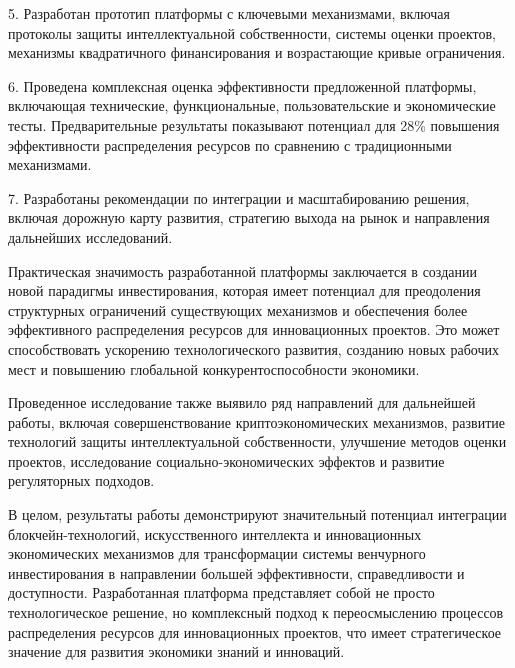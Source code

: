 \documentclass[
    14pt,
    specialist,
    candidate, %
    subf, %
    href,
    times,
    dotsinheaders=false,
    colorlinks=false
]{disser}
\begin{document}
5. Разработан прототип платформы с ключевыми механизмами, включая протоколы защиты интеллектуальной собственности, системы оценки проектов, механизмы квадратичного финансирования и возрастающие кривые ограничения.

6. Проведена комплексная оценка эффективности предложенной платформы, включающая технические, функциональные, пользовательские и экономические тесты. Предварительные результаты показывают потенциал для 28\% повышения эффективности распределения ресурсов по сравнению с традиционными механизмами.

7. Разработаны рекомендации по интеграции и масштабированию решения, включая дорожную карту развития, стратегию выхода на рынок и направления дальнейших исследований.

Практическая значимость разработанной платформы заключается в создании новой парадигмы инвестирования, которая имеет потенциал для преодоления структурных ограничений существующих механизмов и обеспечения более эффективного распределения ресурсов для инновационных проектов. Это может способствовать ускорению технологического развития, созданию новых рабочих мест и повышению глобальной конкурентоспособности экономики.

Проведенное исследование также выявило ряд направлений для дальнейшей работы, включая совершенствование криптоэкономических механизмов, развитие технологий защиты интеллектуальной собственности, улучшение методов оценки проектов, исследование социально-экономических эффектов и развитие регуляторных подходов.

В целом, результаты работы демонстрируют значительный потенциал интеграции блокчейн-технологий, искусственного интеллекта и инновационных экономических механизмов для трансформации системы венчурного инвестирования в направлении большей эффективности, справедливости и доступности. Разработанная платформа представляет собой не просто технологическое решение, но комплексный подход к переосмыслению процессов распределения ресурсов для инновационных проектов, что имеет стратегическое значение для развития экономики знаний и инноваций.

\renewcommand{\bibname}{\fontsize{14pt}{21pt}\selectfont СПИСОК ИСПОЛЬЗОВАННЫХ ИСТОЧНИКОВ}


\end{document}
